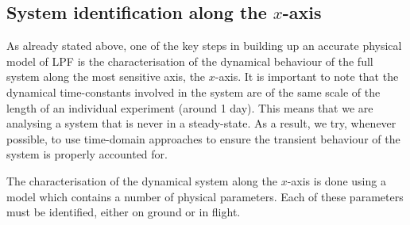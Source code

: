\subsection{System identification along the $x$-axis}

As already stated above, one of the key steps in building up an accurate physical
model of LPF is the characterisation of the dynamical behaviour of the full system
along the most sensitive axis, the $x$-axis. It is important to note that the
dynamical time-constants involved in the system are of the same scale of the length
of an individual experiment (around 1 day). This means that we are analysing
a system that is never in a steady-state. As a result, we try, whenever possible,
to use time-domain approaches to ensure the transient behaviour of the system
is properly accounted for.

\cite{}

The characterisation of the dynamical system along the $x$-axis is done using a model
which contains a number of physical parameters. Each of these parameters must be
identified, either on ground or in flight. 

